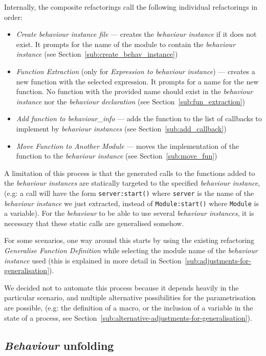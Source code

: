 Internally, the composite refactorings call the following individual
refactorings in order:
\begin{itemize}
\item \emph{Create behaviour instance file} --- creates the \emph{behaviour
instance} if it does not exist. It prompts for the name of the module
to contain the \emph{behaviour instance} (see Section~\ref{sub:create_behav_instance})
\item \emph{Function Extraction} (only for \emph{Expression to behaviour
instance}) --- creates a new function with the selected expression.
It prompts for a name for the new function. No function with the provided
name should exist in the \emph{behaviour instance} nor the \emph{behaviour
declaration} (see Section~\ref{sub:fun_extraction})
\item \emph{Add function to behaviour\_info} --- adds the function to the
list of callbacks to implement by \emph{behaviour instances} (see
Section~\ref{sub:add_callback})
\item \emph{Move Function to Another Module} --- moves the implementation
of the function to the \emph{behaviour instance} (see Section~\ref{sub:move_fun})
\end{itemize}
A limitation of this process is that the generated calls to the functions
added to the \emph{behaviour instances} are statically targeted to
the specified \emph{behaviour instance}, (e.g: a call will have the
form \texttt{server:start()} where \texttt{server} is the name of
the \emph{behaviour instance} we just extracted, instead of \texttt{Module:start()}
where \texttt{Module} is a variable). For the \emph{behaviour} to
be able to use several \emph{behaviour instances}, it is necessary
that these static calls are generalised somehow.

For some scenarios, one way around this starts by using the existing
refactoring \emph{Generalise Function Definition} while selecting
the module name of the \emph{behaviour instance} used (this is explained
in more detail in Section~\ref{sub:adjustments-for-generalisation}).

We decided not to automate this process because it depends heavily
in the particular scenario, and multiple alternative possibilities
for the parametrisation are possible, (e.g: the definition of a macro,
or the inclusion of a variable in the state of a process, see 
Section~\ref{sub:alternative-adjustments-for-generalisation}).


\subsection{\emph{Behaviour} unfolding\label{sec:behaviour-unfolding}}

